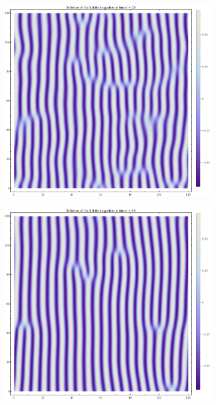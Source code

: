 \begin{figure}[htp]
\centering
\begin{subfigure}{.33\textwidth}
	\centering
	\includegraphics[width=.9\linewidth]{img/chap1/sol_Lif_t20.png}
	\caption{}
	\label{}
	\end{subfigure}%
\begin{subfigure}{.33\textwidth}
	\centering
	\includegraphics[width=.9\linewidth]{img/chap1/sol_Lif_t60.png}
	\caption{}
	\label{}
\end{subfigure}%
\begin{subfigure}{.33\textwidth}

\end{subfigure}
\end{figure}
